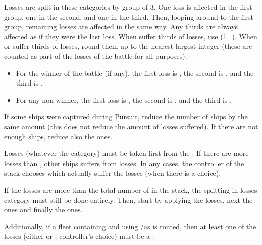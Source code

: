 Losses are split in these categories by group of 3. One loss is affected in
the first group, one in the second, and one in the third. Then, looping around
to the first group, remaining losses are affected in the same way. Any thirds
are always affected as if they were the last loss. When \NWD suffer thirds of
losses, use \NDE (1\NDE=\texttu\NWD). When \NGD or \NTD suffer thirds of
losses, round them up to the nearest largest integer (these are counted as
part of the losses of the battle for all purposes).

\begin{itemize}
\item For the winner of the battle (if any), the first loss is
  , the second is , and the third is
  .
\item For any non-winner, the first loss is , the second is
  , and the third is .
\end{itemize}

If some ships were captured during Pursuit, reduce the number of
 ships by the same amount (this does not reduce the amount of
losses suffered). If there are not enough  ships, reduce also
the  ones.

Losses (whatever the category) must be taken first from the . If there are more losses than , other ships
suffers from losses. In any cases, the controller of the stack chooses which
\ND actually suffer the losses (when there is a choice).

If the losses are more than the total number of \ND in the stack, the
splitting in losses category must still be done entirely. Then, start by
applying the  losses, next the  ones and
finally the  ones.

Additionally, if a fleet containing \VGD and using \NGD/\VGD as  is routed, then at least one of the losses (either
 or , controller's choice) must be a \VGD.


